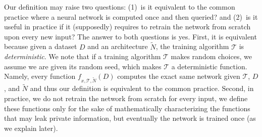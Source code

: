 Our definition may raise two questions: (1)~is it equivalent to the common practice where a neural network is computed once and then queried? and (2)~is it useful in practice if it (supposedly) requires to retrain the network from scratch upon every new input? 
The answer to both questions is yes. First, it is equivalent because given a dataset $D$ and an  architecture $\widetilde{N}$,
  the training algorithm $\mathcal{T}$ is \emph{deterministic}. We note that if a training algorithm $\mathcal{T}$ makes random choices, we assume we are given its random seed, which makes $\mathcal{T}$ a deterministic function. Namely, every function $f_{x,\mathcal{T},\widetilde{N}}(D)$ computes the exact same network given $\mathcal{T}$, $D$, and $\widetilde{N}$ and thus our definition is equivalent to the common practice. 
  Second, in practice, we do not retrain the network from scratch for every input, we define these functions only for the sake of mathematically characterizing the functions that may leak private information, but eventually the network is trained once (as we explain later). 




